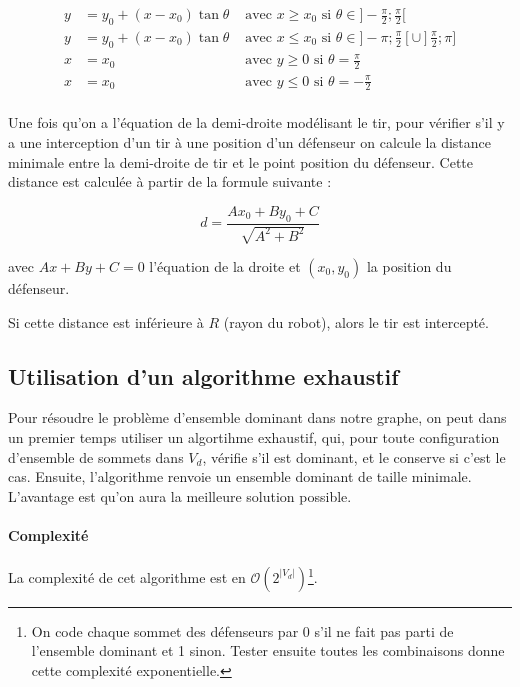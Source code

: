 \documentclass[12pt]{article}
\begin{document}
\begin{align*}
y & =  y_0 + (x - x_0)\tan \theta & \text{ avec $x \geqslant x_0$ si } \theta \in ]-\frac{\pi}{2}; \frac{\pi}{2} [ \\
y & = y_0 + (x - x_0)\tan \theta & \text{ avec $x \leqslant x_0$ si } \theta \in ]-\pi; \frac{\pi}{2}[ \cup ]\frac{\pi}{2}; \pi ] \\
x & = x_0  & \text{ avec $y \geqslant 0$ si } \theta = \frac{\pi}{2} \\
x & = x_0  & \text{ avec $y \leqslant 0$ si } \theta = -\frac{\pi}{2} \\
\end{align*}

Une fois qu'on a l'équation de la demi-droite modélisant le tir, pour vérifier s'il y a une interception d'un tir à une position d'un défenseur on calcule la distance minimale entre la demi-droite de tir et le point position du défenseur. Cette distance est calculée à partir de la formule suivante :

\begin{equation*}
  d = \frac{Ax_0 + By_0 + C}{\sqrt{A^2+B^2}}
\end{equation*}

avec $Ax+By+C = 0$ l'équation de la droite et $(x_0, y_0)$ la position du défenseur.

 Si cette distance est inférieure à $R$ (rayon du robot), alors le tir est intercepté.

\subsection{Utilisation d'un algorithme exhaustif}
Pour résoudre le problème d'ensemble dominant dans notre graphe, on peut dans un premier temps utiliser un algortihme exhaustif, qui, pour toute configuration d'ensemble de sommets dans $V_d$, vérifie s'il est dominant, et le conserve si c'est le cas. Ensuite, l'algorithme renvoie un ensemble dominant de taille minimale. L'avantage est qu'on aura la meilleure solution possible.

\paragraph{Complexité} La complexité de cet algorithme est en $\mathcal{O}(2^{|V_d|})$\footnote{On code chaque sommet des défenseurs par 0 s'il ne fait pas parti de l'ensemble dominant et 1 sinon. Tester ensuite toutes les combinaisons donne cette complexité exponentielle.}.
\end{document}
